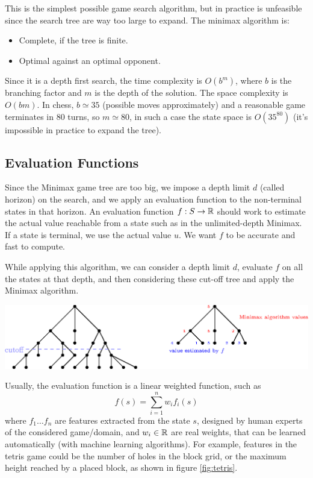 \documentclass[10pt, letterpaper]{report}
\begin{document}
This is the simplest possible game search algorithm, but in practice is unfeasible since the search tree are way too large to expand. The minimax algorithm is:\begin{itemize}
    \item Complete, if the tree is finite.
    \item Optimal against an optimal opponent. 
\end{itemize}
Since it is a depth first search, the time complexity is $O(b^m)$, where $b$ is the branching factor and $m$ is the depth of the solution. The space complexity is $O(bm)$. In chess, $b\simeq 35$ (possible moves approximately) and a reasonable game terminates in $80$ turns, so $m\simeq 80$, in such a case the state space is $O(35^{80})$ (it's impossible in practice to expand the tree).
\subsection{Evaluation Functions}
Since the Minimax game tree are too big, we impose a depth limit $d$ (called horizon) on the search, and we apply an evaluation function to the non-terminal states in that horizon. An evaluation function $f:S\rightarrow {\mathbb R}$ should work to estimate the actual value reachable from a state such as in the unlimited-depth Minimax. If a state is terminal, we use the actual value $u$. We want $f$ to be accurate and fast to compute.\bigskip 

While applying this algorithm, we can consider a depth limit $d$, evaluate $f$ on all the states at that depth, and then considering these cut-off tree and apply the Minimax algorithm.\begin{center}
    \includegraphics[width=1\textwidth ]{images/cutofftree.eps}
\end{center}
Usually, the evaluation function is a linear weighted function, such as \begin{equation}
    f(s)=\sum_{i=1}^nw_if_i(s)
\end{equation}
where $f_1\dots f_n$ are features extracted from the state $s$, designed by human experts of the considered game/domain, and $w_i\in {\mathbb R}$ are real weights, that can be learned automatically (with machine learning algorithms). For example, features in the tetris game could be the number of holes in the block grid, or the maximum height reached by a placed block, as shown in figure \ref{fig:tetris}.\bigskip
\end{document}
